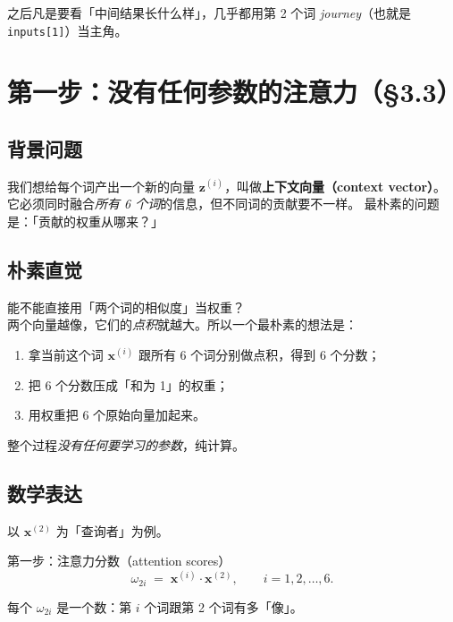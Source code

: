 \documentclass[11pt,a4paper]{ctexart}
\newcommand{\vect}[1]{\boldsymbol{#1}}
\begin{document}
之后凡是要看「中间结果长什么样」，几乎都用第 2 个词 \textit{journey}（也就是 \texttt{inputs[1]}）当主角。

\section{第一步：没有任何参数的注意力（§3.3）}

\subsection{背景问题}

我们想给每个词产出一个新的向量 $\vect{z}^{(i)}$，叫做\textbf{上下文向量（context vector）}。
它必须同时融合\emph{所有 6 个词}的信息，但不同词的贡献要不一样。
最朴素的问题是：「贡献的权重从哪来？」

\subsection{朴素直觉}

\begin{intuitionblock}
能不能直接用「两个词的相似度」当权重？\\
两个向量越像，它们的\emph{点积}就越大。所以一个最朴素的想法是：

\begin{enumerate}
  \item 拿当前这个词 $\vect{x}^{(i)}$ 跟所有 6 个词分别做点积，得到 6 个分数；
  \item 把 6 个分数压成「和为 1」的权重；
  \item 用权重把 6 个原始向量加起来。
\end{enumerate}

整个过程\emph{没有任何要学习的参数}，纯计算。
\end{intuitionblock}

\subsection{数学表达}

以 $\vect{x}^{(2)}$ 为「查询者」为例。

\begin{mathbox}{第一步：注意力分数（attention scores）}
\[
  \omega_{2i} \;=\; \vect{x}^{(i)} \cdot \vect{x}^{(2)},
  \qquad i = 1, 2, \dots, 6.
\]
\end{mathbox}

每个 $\omega_{2i}$ 是一个数：第 $i$ 个词跟第 2 个词有多「像」。
\end{document}
